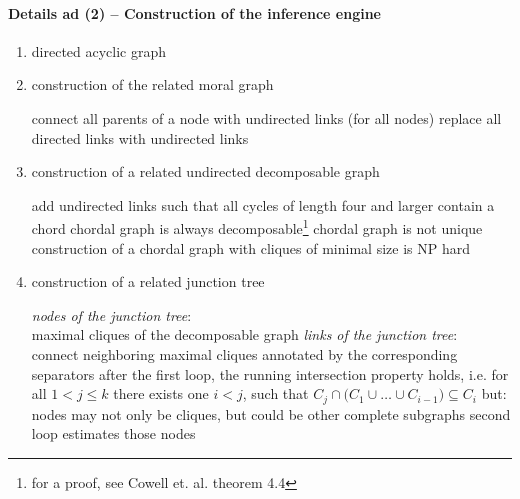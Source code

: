 \paragraph{Details ad (2) -- Construction of the inference engine}\label{sec:details}
\begin{enumerate}[-a-]
\item directed acyclic graph
\item construction of the related moral graph 
  \begin{itemize}
    \itr connect all parents of a node with undirected links (for 
    all nodes)
    \itr replace all directed links with undirected links 
  \end{itemize}
  \item construction of a related undirected decomposable graph 
  \begin{itemize}
    \itr add undirected links such that all cycles of length four and
    larger contain a chord \itr chordal graph is always decomposable\footnote{for a proof, see Cowell et. al. theorem 4.4} 
    \itr chordal graph is not unique 
    \itr construction of a chordal graph with cliques of minimal size is NP hard 
  \end{itemize}
  \item construction of a related junction tree
  \begin{itemize}
    \itr \emph{nodes of the junction tree}:\\
    maximal cliques of the decomposable graph
    \itr \emph{links of the junction tree}:\\
    connect neighboring maximal cliques annotated by the corresponding separators 
    \itr after the first loop, the running intersection
    property holds, i.e. for all $1 < j \leq k$ 
    there exists one $i < j$, such that $C_j \cap
    \big( C_1 \cup \ldots \cup C_{i-1} \big) 
    \subseteq C_i$
    \itr but: nodes may not only be cliques, but could be 
    other complete subgraphs
    \itr second loop estimates those nodes
  \end{itemize}
\end{enumerate}

